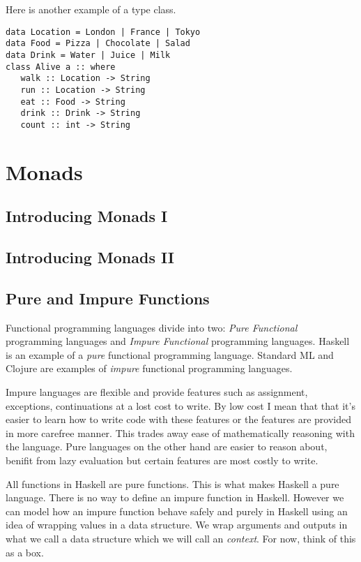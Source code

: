 Here is another example of a type class. 
\begin{lstlisting}
data Location = London | France | Tokyo
data Food = Pizza | Chocolate | Salad
data Drink = Water | Juice | Milk
class Alive a :: where
   walk :: Location -> String
   run :: Location -> String
   eat :: Food -> String
   drink :: Drink -> String
   count :: int -> String
\end{lstlisting}






\chapter{Monads}

\section{Introducing Monads I}
\section{Introducing Monads II}

\section{Pure and Impure Functions}

Functional programming languages divide into two: \textit{Pure Functional} programming languages 
and \textit{Impure Functional} programming languages. Haskell is an example of a \textit{pure} functional programming language. 
Standard ML and Clojure are examples of \textit{impure} functional programming languages.

Impure languages are flexible and provide features such as assignment, exceptions, 
continuations at a lost cost to write. By low cost I mean that that it's easier to learn how to write code with these features or the features are provided in more carefree manner. 
This trades away ease of mathematically reasoning with the language.
Pure languages on the other hand are easier to reason about, benifit from lazy evaluation
but certain features are most costly to write.


All functions in Haskell are pure functions. This is what makes Haskell a pure language.
There is no way to define an impure function in Haskell.
However we can model how an impure function behave safely and purely in Haskell
using an idea of {wrapping values} in a data structure. 
We wrap arguments and outputs in what we call a data structure which we will call an
 \textit{context}. For now, think of this as a box.

